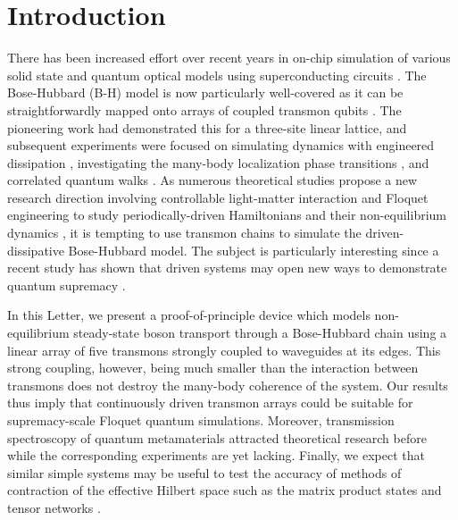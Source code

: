 \documentclass[%
 aps, pra,
 amsmath,amssymb,
 reprint,%
superscriptaddress
]{revtex4-2}
\begin{document}
\maketitle

\section{Introduction}


There has been increased effort over recent years in on-chip simulation of various solid state and quantum optical models using superconducting circuits \cite{kjaergaard2019superconducting}. The Bose-Hubbard (B-H) model is now particularly well-covered as it can be straightforwardly mapped onto arrays of coupled transmon qubits \cite{orell2019probing}. The pioneering work \cite{hacohen2015cooling} had demonstrated this for a three-site linear lattice, and subsequent experiments were focused on simulating dynamics with engineered dissipation \cite{ma2019dissipatively}, investigating the many-body localization phase transitions \cite{roushan2017spectroscopic,chiaro2019growth}, and correlated quantum walks \cite{Yan2019, Ye2019}. As numerous theoretical studies propose a new research direction involving controllable light-matter interaction and Floquet engineering to study periodically-driven Hamiltonians and their non-equilibrium dynamics \cite{Goldman2014, eisert2015quantum, Zippilli2015, kyriienko2018floquet, franca2020simulating}, it is tempting to use transmon chains  to simulate the driven-dissipative Bose-Hubbard model. The subject is particularly interesting since a recent study has shown that driven systems may open new ways to demonstrate quantum supremacy \cite{tangpanitanon2019quantum}.

In this Letter, we present a proof-of-principle device which models non-equilibrium steady-state boson transport through a Bose-Hubbard chain using a linear array of five transmons strongly coupled to waveguides at its edges. This strong coupling, however, being much smaller than the interaction between transmons does not destroy the many-body coherence of the system. Our results thus imply that continuously driven transmon arrays could be suitable for supremacy-scale Floquet quantum simulations. Moreover, transmission spectroscopy of quantum metamaterials attracted theoretical research before \cite{Zagoskin2016, viehmann2013observing, Greenberg2015, Fistul2019, Biella2015,roberts2020driven, collodo2019observation} while the corresponding experiments are yet lacking. Finally, we expect that similar simple systems may be useful to test the accuracy of methods of contraction of the effective Hilbert space such as the matrix product states and tensor networks  \cite{Biella2015, orell2019probing, di2019efficient}.
\end{document}

